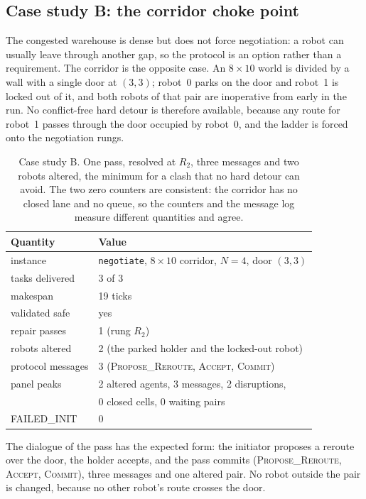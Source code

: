 \documentclass[10pt,a4paper]{article}
\newcommand{\code}[1]{\texttt{#1}}
\begin{document}
\subsection{Case study B: the corridor choke point}\label{sec:caseB}

The congested warehouse is dense but does not force negotiation: a robot can
usually leave through another gap, so the protocol is an option rather than a
requirement.  The corridor is the opposite case.  An $8\times10$ world is
divided by a wall with a single door at $(3,3)$; robot~0 parks on the door
and robot~1 is locked out of it, and both robots of that pair are inoperative
from early in the run.  No conflict-free hard detour is therefore available,
because any route for robot~1 passes through the door occupied by robot~0,
and the ladder is forced onto the negotiation rungs.

\begin{table}[H]
\centering
\small
\setlength{\tabcolsep}{6pt}
\begin{tabular}{@{}l l@{}}
\toprule
\textbf{Quantity} & \textbf{Value}\\
\midrule
instance          & \code{negotiate}, $8\times10$ corridor, $N=4$, door $(3,3)$\\
tasks delivered   & 3 of 3\\
makespan          & 19 ticks\\
validated safe    & yes\\
repair passes     & 1 (rung $R_2$)\\
robots altered    & 2 (the parked holder and the locked-out robot)\\
protocol messages & 3 (\textsc{Propose\_Reroute}, \textsc{Accept}, \textsc{Commit})\\
panel peaks       & 2 altered agents, 3 messages, 2 disruptions,\\
                  & 0 closed cells, 0 waiting pairs\\
FAILED\_INIT      & 0\\
\bottomrule
\end{tabular}
\caption{Case study B.  One pass, resolved at $R_2$, three messages and two
robots altered, the minimum for a clash that no hard detour can avoid.  The
two zero counters are consistent: the corridor has no closed lane and no
queue, so the counters and the message log measure different quantities and
agree.}
\label{tab:caseB}
\end{table}

The dialogue of the pass has the expected form: the initiator proposes a
reroute over the door, the holder accepts, and the pass commits
(\textsc{Propose\_Reroute}, \textsc{Accept}, \textsc{Commit}), three messages
and one altered pair.  No robot outside the pair is changed, because no other
robot's route crosses the door.
\end{document}
